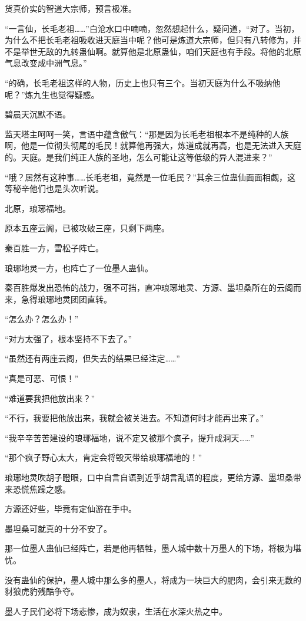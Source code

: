 \begin{this_body}
货真价实的智道大宗师，预言极准。

“一言仙，长毛老祖……”白沧水口中喃喃，忽然想起什么，疑问道，“对了。当初，为什么不把长毛老祖吸收进天庭当中呢？他可是炼道大宗师，但只有八转修为，并不是举世无敌的九转蛊仙啊。就算他是北原蛊仙，咱们天庭也有手段。将他的北原气息改变成中洲气息。”

“的确，长毛老祖这样的人物，历史上也只有三个。当初天庭为什么不吸纳他呢？”炼九生也觉得疑惑。

碧晨天沉默不语。

监天塔主呵呵一笑，言语中蕴含傲气：“那是因为长毛老祖根本不是纯种的人族啊，他是一位彻头彻尾的毛民！就算他再强大，炼道成就再高，也是无法进入天庭的。天庭。是我们纯正人族的圣地，怎么可能让这等低级的异人混进来？”

“哦？居然有这种事……长毛老祖，竟然是一位毛民？”其余三位蛊仙面面相觑，这等秘辛他们也是头次听说。

北原，琅琊福地。

原本五座云阁，已被攻破三座，只剩下两座。

秦百胜一方，雪松子阵亡。

琅琊地灵一方，也阵亡了一位墨人蛊仙。

秦百胜爆发出恐怖的战力，强不可挡，直冲琅琊地灵、方源、墨坦桑所在的云阁而来，急得琅琊地灵团团直转。

“怎么办？怎么办！”

“对方太强了，根本坚持不下去了。”

“虽然还有两座云阁，但失去的结果已经注定……”

“真是可恶、可恨！”

“难道要我把他放出来？”

“不行，我要把他放出来，我就会被关进去。不知道何时才能再出来了。”

“我辛辛苦苦建设的琅琊福地，说不定又被那个疯子，提升成洞天……”

“那个疯子野心太大，肯定会将毁灭带给琅琊福地的！”

琅琊地灵吹胡子瞪眼，口中自言自语到近乎胡言乱语的程度，更给方源、墨坦桑带来恐慌焦躁之感。

方源还好些，毕竟有定仙游在手中。

墨坦桑可就真的十分不安了。

那一位墨人蛊仙已经阵亡，若是他再牺牲，墨人城中数十万墨人的下场，将极为堪忧。

没有蛊仙的保护，墨人城中那么多的墨人，将成为一块巨大的肥肉，会引来无数的豺狼虎豹残酷争夺。

墨人子民们必将下场悲惨，成为奴隶，生活在水深火热之中。


\end{this_body}
